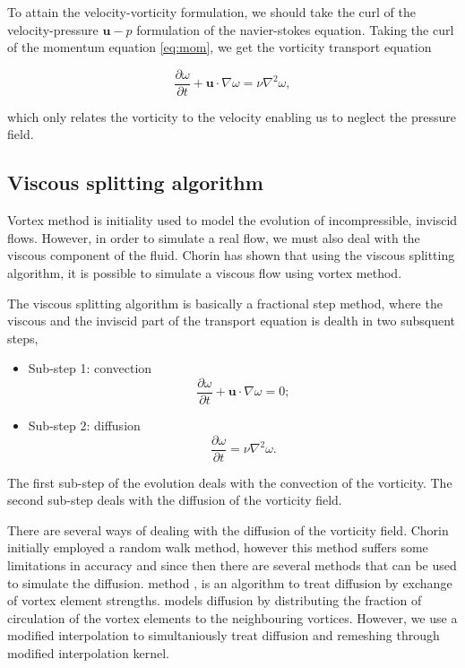 To attain the velocity-vorticity formulation, we should take the curl of the velocity-pressure $\mathbf{u}-p$ formulation of the navier-stokes equation. Taking the curl of the momentum equation \ref{eq:mom}, we get the vorticity transport equation

	\begin{equation}
	\frac{\partial \omega}{\partial t} + \mathbf{u}\cdot\nabla\omega = \nu \nabla^2 \omega,
	\end{equation}

which only relates the vorticity to the velocity enabling us to neglect the pressure field.


\subsection{Viscous splitting algorithm}
Vortex method is initiality used to model the evolution of incompressible, inviscid flows. However, in order to simulate a real flow, we must also deal with the viscous component of the fluid. Chorin \cite{Chorin1973} has shown that using the viscous splitting algorithm, it is possible to simulate a viscous flow using vortex method. 

The viscous splitting algorithm is basically a fractional step method, where the viscous and the inviscid part of the transport equation is dealth in two subsquent steps, 

	\begin{itemize}
	\item Sub-step 1: convection
		\begin{equation}
		\frac{\partial\omega}{\partial t} + \mathbf{u}\cdot\nabla\omega=0;
		\label{eq:convectionEulerian}
		\end{equation}
		
	\item Sub-step 2: diffusion
		\begin{equation}
		\frac{\partial\omega}{\partial t} = \nu\nabla^2\omega.
		\end{equation}
	
	\end{itemize}

The first sub-step of the evolution deals with the convection of the vorticity. The second sub-step deals with the diffusion of the vorticity field. 

There are several ways of dealing with the diffusion of the vorticity field. Chorin initially employed a random walk method, however this method suffers some limitations in accuracy and since then there are several methods that can be used to simulate the diffusion.  method \cite{Degond1989}, is an algorithm to treat diffusion by exchange of vortex element strengths.  \cite{Shankar1996} models diffusion by distributing the fraction of circulation of the vortex elements to the neighbouring vortices. However, we use a modified interpolation \cite{Wee2006} to simultaniously treat diffusion and remeshing through modified interpolation kernel. 

